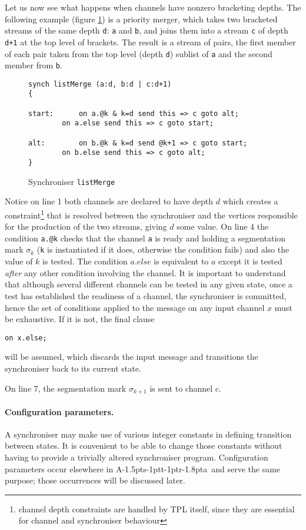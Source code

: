 \documentclass[11pt]{report}
\def\ak{{\textsf{A\kern-1.5pts\kern-1ptt\kern-1ptr\kern-1.8pta}}\kern-2pt{\it K\kern-2ptahn}}
\begin{document}
Let us now see what happens when channels have nonzero bracketing depths. The following example (figure \ref{listMerge}) is a priority merger,
which takes two bracketed streams of the same depth \verb$d$: \verb$a$ and \verb$b$, and joins them into a stream \verb$c$ of depth
\verb$d+1$ at the top level of brackets. The result is a stream of pairs, the first member of each pair taken from the
top level (depth \verb$d$) sublist of \verb$a$ and the second member from \verb$b$.
\begin{figure}
\begin{lstlisting}[frame=single]
synch listMerge (a:d, b:d | c:d+1)
{

start:		on a.@k & k=d send this => c goto alt;
		on a.else send this => c goto start;

alt:		on b.@k & k=d send @k+1 => c goto start;
		on b.else send this => c goto alt;
}
\end{lstlisting}
\caption{Synchroniser {\tt listMerge}\label{listMerge}}
\end{figure}
Notice on line 1 both channels are declared to have depth $d$ which creates a constraint\footnote{channel depth constraints are handled by TPL itself, since they are essential for channel and synchroniser behaviour} that is resolved between the synchroniser
and the vertices responsible for the production of the two streams, giving $d$ some value. On line 4 the condition \verb$a.@k$
checks that the channel \verb$a$ is ready and holding a segmentation mark $\sigma_k$
(\verb$k$ is instantiated if it does, otherwise the condition fails) and also the value of $k$ is tested. The condition $a.else$ is equivalent to $a$
except it is tested {\em after} any other condition involving the channel. It is important to understand that although several different
channels can be tested in any given state, once a test has established the readiness of a channel, the synchroniser is committed, hence
the set of conditions applied to the message on any input channel $x$ must be exhaustive. If it is not, the final clause
\begin{lstlisting}[numbers=none]
		on x.else;
\end{lstlisting}
will be assumed, which discards the input message and transitions the synchroniser back to its current state.

On line 7, the segmentation mark $\sigma_{k+1}$ is sent to channel $c$.

\paragraph{Configuration parameters.} A synchroniser may make use of various integer constants in defining transition between states. It is convenient to be able to change those constants without having to provide a trivially altered synchroniser program. Configuration parameters occur elsewhere in \ak\ and serve the same purpose; those occurrences will be discussed later.
\end{document}
